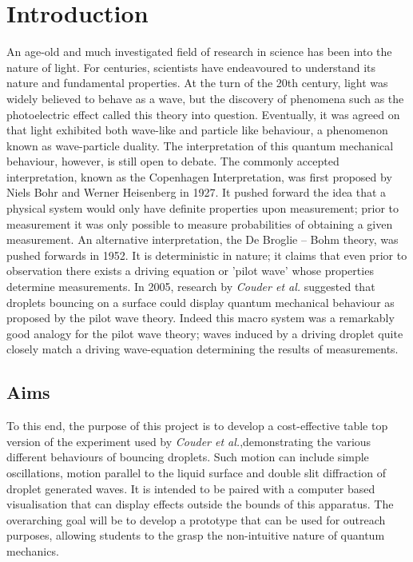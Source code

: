 \section{Introduction}
An age-old and much investigated field of research in science has been into the nature of light. For centuries, scientists have endeavoured to understand its nature and fundamental properties. At the turn of the 20th century, light was widely believed to behave as a wave, but the discovery of phenomena such as the photoelectric effect called this theory into question. Eventually, it was agreed on that light exhibited both wave-like and particle like behaviour, a phenomenon known as wave-particle duality. The interpretation of this quantum mechanical behaviour, however, is still open to debate. The commonly accepted interpretation, known as the Copenhagen Interpretation, was first proposed by Niels Bohr and Werner Heisenberg in 1927. It pushed forward the idea that a physical system would only have definite properties upon measurement; prior to measurement it was only possible to measure probabilities of obtaining a given measurement. An alternative interpretation, the De Broglie – Bohm theory, was pushed forwards in 1952. It is deterministic in nature; it claims that even prior to observation there exists a driving equation or 'pilot wave' whose properties determine measurements. In 2005, research by \textit{Couder et al.} \cite{couder} suggested that droplets bouncing on a surface could display quantum mechanical behaviour as proposed by the pilot wave theory. Indeed this macro system was a remarkably good analogy  for the pilot wave theory; waves induced by a driving droplet quite closely match a driving wave-equation determining the results of measurements. 
\subsection{Aims}
To this end, the purpose of this project is to develop a cost-effective table top version of the experiment used by \textit{Couder et al.},demonstrating the various different behaviours of bouncing droplets. Such motion can include simple oscillations, motion parallel to the liquid surface and double slit diffraction of droplet generated waves. It is intended to be paired with a computer based visualisation that can display effects outside the bounds of this apparatus. The overarching goal will be to develop a prototype that can be used for outreach purposes, allowing  students to the grasp the non-intuitive nature of quantum mechanics. 

